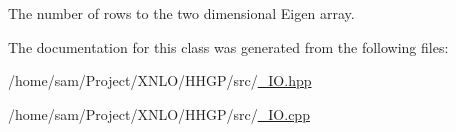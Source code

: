 The number of rows to the two dimensional Eigen array. 

The documentation for this class was generated from the following files\+:\begin{DoxyCompactItemize}
\item 
/home/sam/\+Project/\+X\+N\+L\+O/\+H\+H\+G\+P/src/\hyperlink{___i_o_8hpp}{\+\_\+\+I\+O.\+hpp}\item 
/home/sam/\+Project/\+X\+N\+L\+O/\+H\+H\+G\+P/src/\hyperlink{___i_o_8cpp}{\+\_\+\+I\+O.\+cpp}\end{DoxyCompactItemize}
